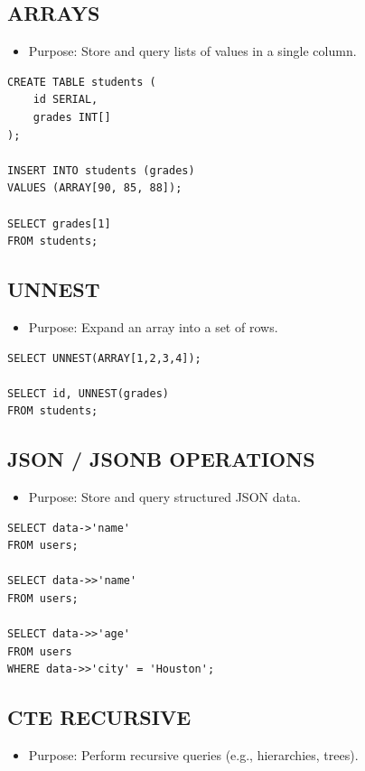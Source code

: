 \documentclass[10pt]{article}
\begin{document}
\subsection{ARRAYS}
\begin{itemize}
    \item Purpose: Store and query lists of values in a single column.
\end{itemize}

\begin{verbatim}
CREATE TABLE students (
    id SERIAL,
    grades INT[]
);

INSERT INTO students (grades)
VALUES (ARRAY[90, 85, 88]);

SELECT grades[1]
FROM students;
\end{verbatim}

\subsection{UNNEST}
\begin{itemize}
    \item Purpose: Expand an array into a set of rows.
\end{itemize}

\begin{verbatim}
SELECT UNNEST(ARRAY[1,2,3,4]);

SELECT id, UNNEST(grades)
FROM students;
\end{verbatim}

\subsection{JSON / JSONB OPERATIONS}
\begin{itemize}
    \item Purpose: Store and query structured JSON data.
\end{itemize}

\begin{verbatim}
SELECT data->'name'
FROM users;

SELECT data->>'name'
FROM users;

SELECT data->>'age'
FROM users
WHERE data->>'city' = 'Houston';
\end{verbatim}

\subsection{CTE RECURSIVE}
\begin{itemize}
    \item Purpose: Perform recursive queries (e.g., hierarchies, trees).
\end{itemize}
\end{document}
